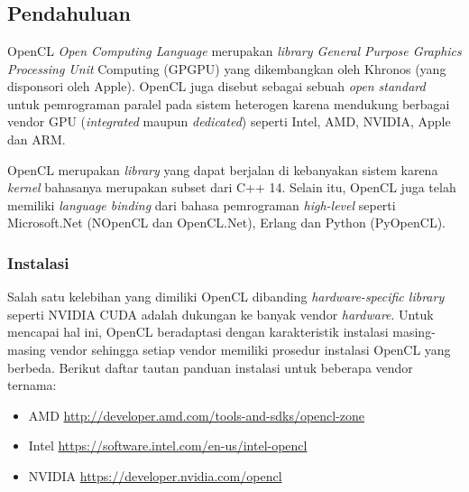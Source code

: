 \chapter{\topikDua}

\section{Pendahuluan}

OpenCL \textit{Open Computing Language} merupakan \textit{library General Purpose Graphics Processing Unit} Computing (GPGPU) yang dikembangkan oleh Khronos (yang disponsori oleh Apple). OpenCL juga disebut sebagai sebuah \textit{open standard} untuk pemrograman paralel pada sistem heterogen karena mendukung berbagai vendor GPU (\textit{integrated} maupun \textit{dedicated}) seperti Intel, AMD, NVIDIA, Apple dan ARM.

OpenCL merupakan \textit{library} yang dapat berjalan di kebanyakan sistem karena \textit{kernel} bahasanya merupakan subset dari C++ 14. Selain itu, OpenCL juga telah memiliki \textit{language binding} dari bahasa pemrograman \textit{high-level} seperti Microsoft.Net (NOpenCL dan OpenCL.Net), Erlang dan Python (PyOpenCL).

\subsection{Instalasi}

Salah satu kelebihan yang dimiliki OpenCL dibanding \textit{hardware-specific library} seperti NVIDIA CUDA adalah dukungan ke banyak vendor \textit{hardware}. Untuk mencapai hal ini, OpenCL beradaptasi dengan karakteristik instalasi masing-masing vendor sehingga setiap vendor memiliki prosedur instalasi OpenCL yang berbeda. Berikut daftar tautan panduan instalasi untuk beberapa vendor ternama:

\begin{itemize}
	\item AMD \url{http://developer.amd.com/tools-and-sdks/opencl-zone​}
	\item Intel \url{https://software.intel.com/en-us/intel-opencl​}
	\item NVIDIA \url{https://developer.nvidia.com/opencl}
\end{itemize}

